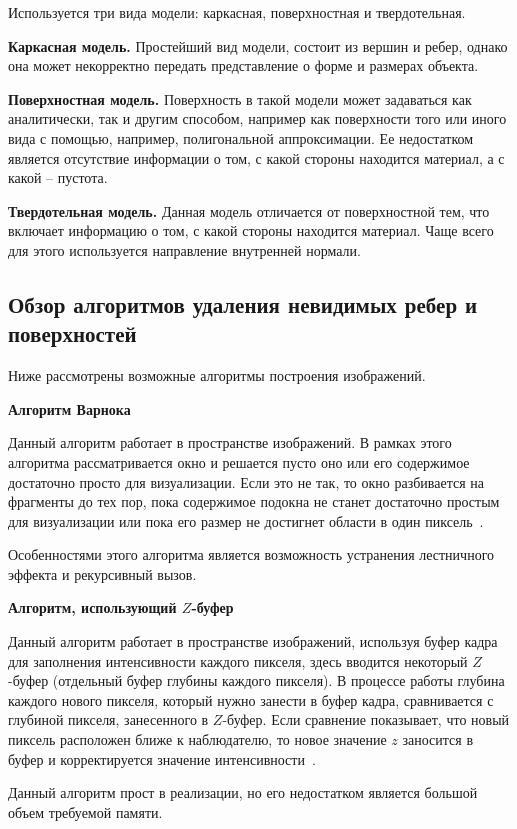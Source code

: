 Используется три вида модели: каркасная, поверхностная и твердотельная.

\textbf{Каркасная модель.} Простейший вид модели, состоит из вершин и ребер, однако она может некорректно передать представление о форме и размерах объекта.

\textbf{Поверхностная модель.} Поверхность в такой модели может задаваться как аналитически, так и другим способом, например как поверхности того или иного вида с помощью, например, полигональной аппроксимации. Ее недостатком является отсутствие информации о том, с какой стороны находится материал, а с какой -- пустота.

\textbf{Твердотельная модель.} Данная модель отличается от поверхностной тем, что включает информацию о том, с какой стороны находится материал. Чаще всего для этого используется направление внутренней нормали.

\subsection{Обзор алгоритмов удаления невидимых ребер и поверхностей}
Ниже рассмотрены возможные алгоритмы построения изображений.

\textbf{Алгоритм Варнока}

Данный алгоритм работает в пространстве изображений. В рамках этого алгоритма рассматривается окно и решается пусто оно или его содержимое достаточно просто для визуализации. Если это не так, то окно разбивается на фрагменты до тех пор, пока содержимое подокна не станет достаточно простым для визуализации или пока его размер не достигнет области в один пиксель~\cite{rodgers}.

Особенностями этого алгоритма является возможность устранения лестничного эффекта и рекурсивный вызов.

\textbf{Алгоритм, использующий $Z$-буфер}

Данный алгоритм работает в пространстве изображений, используя буфер кадра для заполнения интенсивности каждого пикселя, здесь вводится некоторый $Z$-буфер (отдельный буфер глубины каждого пикселя). 
В процессе работы глубина каждого нового пикселя, который нужно занести в буфер кадра, сравнивается с глубиной пикселя, занесенного в $Z$-буфер. Если сравнение показывает, что новый пиксель расположен ближе к наблюдателю, то новое значение $z$ заносится в буфер и корректируется значение интенсивности~\cite{rodgers}.

Данный алгоритм прост в реализации, но его недостатком является большой объем требуемой памяти.

